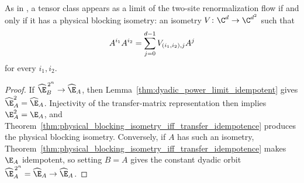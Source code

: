 \begin{theorem}
    \label{thm:renormalization_flow}
    \leanok
    As in \cite[Theorem~3.1 and lines~1205--1209]{Cirac2016MPDO_arXiv}, a
    tensor class appears as a limit of the two-site renormalization flow if
    and only if it has a physical blocking isometry: an isometry
    $V\colon\C^d\to\C^{d^2}$ such that
    \begin{align}
        A^{i_1}A^{i_2}
        =\sum_{j=0}^{d-1}V_{(i_1,i_2),j}A^j
        \notag
    \end{align}
    for every $i_1,i_2$.

\end{theorem}
\begin{proof}\leanok
    If $\widehat{\E}_B^{\,2^n}\to\widehat{\E}_A$, then
    Lemma~\ref{thm:dyadic_power_limit_idempotent} gives
    $\widehat{\E}_A^2=\widehat{\E}_A$. Injectivity of the transfer-matrix
    representation then implies $\E_A^2=\E_A$, and
    Theorem~\ref{thm:physical_blocking_isometry_iff_transfer_idempotence}
    produces the physical blocking isometry. Conversely, if $A$ has such an
    isometry, Theorem~\ref{thm:physical_blocking_isometry_iff_transfer_idempotence}
    makes $\E_A$ idempotent, so setting $B=A$ gives the constant dyadic orbit
    $\widehat{\E}_A^{\,2^n}=\widehat{\E}_A\to\widehat{\E}_A$.
\end{proof}

